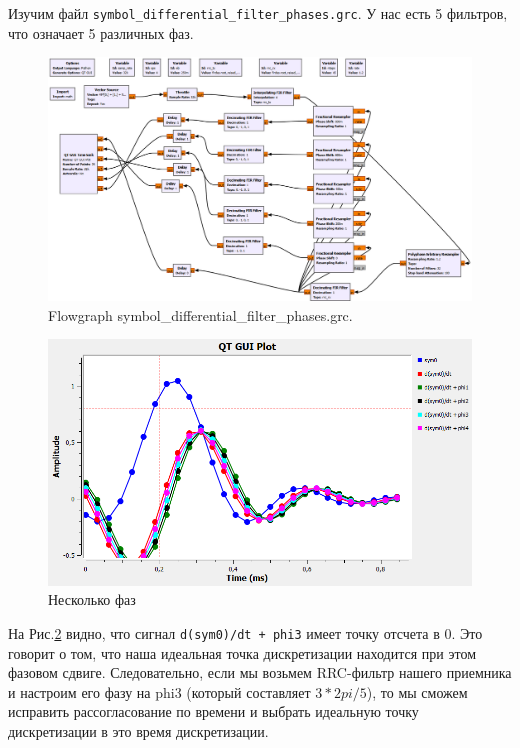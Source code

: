 \documentclass[a4paper, 14pt]{extarticle}
\begin{document}
    Изучим файл \texttt{symbol\_differential\_filter\_phases.grc}.
    У нас есть 5 фильтров, что означает 5 различных фаз.

    \begin{figure}[h]
        \centering
        \includegraphics[width=0.8\linewidth]{resources/Images/task3_symbol_differential_filter_phases}
        \caption{Flowgraph symbol\_differential\_filter\_phases.grc.}
        \label{fig:task3_symbol_differential_filter_phases}
    \end{figure}

    \begin{figure}[h]
        \centering
        \includegraphics[width=0.8\linewidth]{resources/Images/task3_phases}
        \caption{Несколько фаз}
        \label{fig:task3_phases}
    \end{figure}

    На Рис.\ref{fig:task3_phases} видно, что сигнал \texttt{d(sym0)/dt + phi3} имеет точку отсчета в 0.
    Это говорит о том, что наша идеальная точка дискретизации находится при этом фазовом сдвиге.
    Следовательно, если мы возьмем RRC-фильтр нашего приемника и настроим его фазу на phi3
    (который составляет $3 * 2pi / 5$), то мы сможем исправить рассогласование по времени и выбрать
    идеальную точку дискретизации в это время дискретизации.
\end{document}
